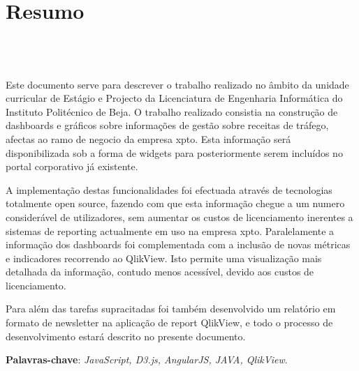 \chapter{Resumo}
\section*{\textit{\TITULO}\\  {\small{\textit{\SUBTITULO}}}}

\par Este documento serve para descrever o trabalho realizado no âmbito da unidade curricular de Estágio e Projecto da Licenciatura de Engenharia Informática do Instituto Politécnico de Beja. O trabalho realizado consistia na construção de dashboards e gráficos sobre informações de gestão sobre receitas de tráfego, afectas ao ramo de negocio da empresa xpto. Esta informação será disponibilizada sob a forma de widgets para posteriormente serem incluídos no portal corporativo já existente.
\par A implementação destas funcionalidades foi efectuada através de tecnologias totalmente open source, fazendo com que esta informação chegue a um numero considerável de utilizadores, sem aumentar os custos de licenciamento inerentes a sistemas de reporting actualmente em uso na empresa xpto. Paralelamente a informação dos dashboards foi complementada com a inclusão de novas métricas e indicadores recorrendo ao QlikView. Isto permite uma visualização mais detalhada da informação, contudo menos acessível, devido aos custos de licenciamento.
\par Para além das tarefas supracitadas foi também desenvolvido um relatório em formato de newsletter na aplicação de report QlikView, e todo o processo de desenvolvimento estará descrito no presente documento.\newline

\textbf{Palavras-chave}: \textit{JavaScript, D3.js, AngularJS, JAVA, QlikView}.